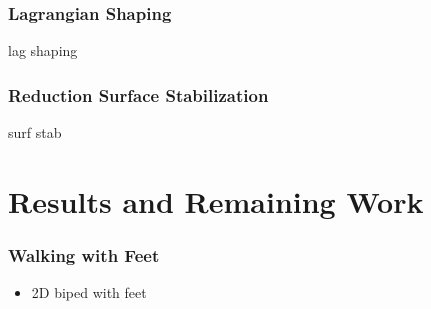 \documentclass{beamer}
\begin{document}
\begin{frame}
  \frametitle{Lagrangian Shaping}
  lag shaping
\end{frame}

\begin{frame}
  \frametitle{Reduction Surface Stabilization}
  surf stab
\end{frame}

\section{Results and Remaining Work}
\begin{frame}
  \frametitle{Walking with Feet}
  \begin{itemize}
  \item 2D biped with feet
  \end{itemize}
\end{frame}


%
%
%



\end{document}
